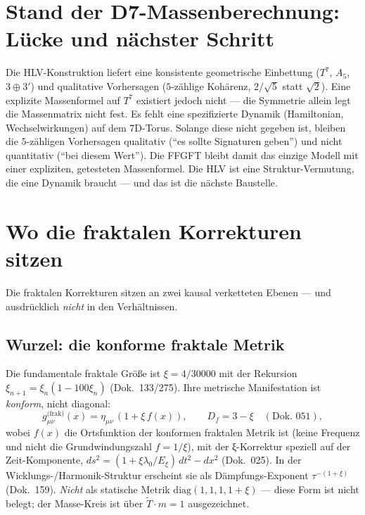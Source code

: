 \section{Stand der D7-Massenberechnung: L\"ucke und n\"achster Schritt}
Die HLV-Konstruktion liefert eine konsistente geometrische Einbettung ($T^7$, $A_5$,
$3\oplus3'$) und qualitative Vorhersagen ($5$-z\"ahlige Koh\"arenz, $2/\sqrt5$ statt $\sqrt2$).
Eine explizite Massenformel auf $T^7$ existiert jedoch nicht --- die Symmetrie allein legt die
Massenmatrix nicht fest. Es fehlt eine spezifizierte Dynamik (Hamiltonian, Wechselwirkungen)
auf dem 7D-Torus. Solange diese nicht gegeben ist, bleiben die $5$-z\"ahligen Vorhersagen
qualitativ (\enquote{es sollte Signaturen geben}) und nicht quantitativ (\enquote{bei diesem
Wert}). Die FFGFT bleibt damit das einzige Modell mit einer expliziten, getesteten
Massenformel. Die HLV ist eine Struktur-Vermutung, die eine Dynamik braucht --- und das ist die
n\"achste Baustelle.

\section{Wo die fraktalen Korrekturen sitzen}
Die fraktalen Korrekturen sitzen an zwei kausal verketteten Ebenen --- und ausdr\"ucklich
\emph{nicht} in den Verh\"altnissen.

\subsection{Wurzel: die konforme fraktale Metrik}
Die fundamentale fraktale Gr\"o\ss e ist $\xi=4/30000$ mit der Rekursion
$\xi_{n+1}=\xi_n(1-100\xi_n)$ (Dok.~133/275). Ihre metrische Manifestation ist \emph{konform}, nicht
diagonal:
\[
g_{\mu\nu}^{\text{(frak)}}(x)=\eta_{\mu\nu}\,(1+\xi\,f(x)),\qquad D_f=3-\xi\quad(\text{Dok.~051}),
\]
wobei $f(x)$ die Ortsfunktion der konformen fraktalen Metrik ist (keine Frequenz und nicht die
Grundwindungszahl $f = 1/\xi$), mit der ξ-Korrektur speziell auf der Zeit-Komponente, $ds^2=(1+\xi\lambda_0/E_\xi)\,dt^2-dx^2$
(Dok.~025). In der Wicklungs-/Harmonik-Struktur erscheint sie als D\"ampfungs-Exponent
$\tau^{-(1+\xi)}$ (Dok.~159). \emph{Nicht} als statische Metrik $\mathrm{diag}(1,1,1,1+\xi)$ --- diese
Form ist nicht belegt; der Masse-Kreis ist \"uber $\tilde{T}\cdot m=1$ ausgezeichnet.

